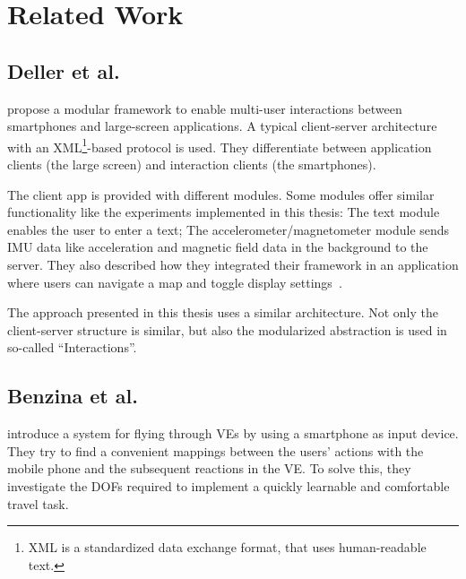 \chapter{Related Work}\label{chapter:related-work}


\section{Deller et al.}\label{section:deller-2011}
\citeauthor{Deller.2011} propose a modular framework to enable multi-user interactions between smartphones and large-screen applications. A typical client-server architecture with an XML\footnote{XML is a standardized data exchange format, that uses human-readable text.}-based protocol is used. They differentiate between application clients (the large screen) and interaction clients (the smartphones).

The client app is provided with different modules. Some modules offer similar functionality like the experiments implemented in this thesis: The text module enables the user to enter a text; The accelerometer/magnetometer module sends \gls{IMU} data like acceleration and magnetic field data in the background to the server. They also described how they integrated their framework in an application where users can navigate a map and toggle display settings~\cite{Deller.2011}.

The approach presented in this thesis uses a similar architecture. Not only the client-server structure is similar, but also the modularized abstraction is used in so-called \enquote{Interactions}.


\section{Benzina et al.}\label{section:benzina-2011}
\citeauthor{Benzina.2011} introduce a system for flying through \glspl{VE} by using a smartphone as input device.
They try to find a convenient mappings between the users' actions with the mobile phone and the subsequent reactions in the \gls{VE}. To solve this, they investigate the \glspl{DOF} required to implement a quickly learnable and comfortable travel task.

